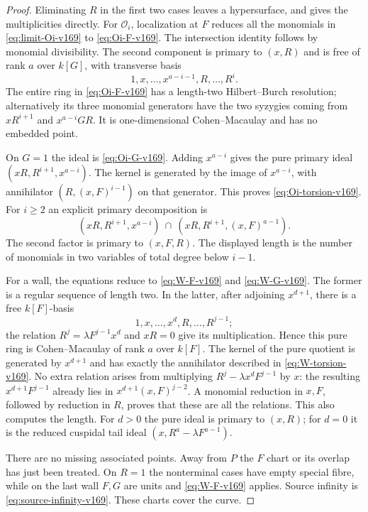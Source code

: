 \documentclass[11pt,reqno]{amsart}
\numberwithin{equation}{section}
\theoremstyle{definition}\newtheorem{definition}[theorem]{Definition}
\theoremstyle{remark}\newtheorem{remark}[theorem]{Remark}
\begin{document}
\begin{proof}
Eliminating $R$ in the first two cases leaves a hypersurface, and gives
the multiplicities directly. For $\mathcal O_i$, localization at $F$
reduces all the monomials in \eqref{eq:limit-Oi-v169} to
\eqref{eq:Oi-F-v169}. The intersection identity follows by monomial
divisibility. The second component is primary to $(x,R)$ and is free
of rank $a$ over $k[G]$, with transverse basis
\[
 1,x,\ldots,x^{a-i-1},R,\ldots,R^i.
\]
The entire ring in \eqref{eq:Oi-F-v169} has a length-two
Hilbert--Burch resolution; alternatively its three monomial generators
have the two syzygies coming from $xR^{i+1}$ and $x^{a-i}GR$.
It is one-dimensional Cohen--Macaulay and has no embedded point.

On $G=1$ the ideal is \eqref{eq:Oi-G-v169}. Adding $x^{a-i}$ gives
the pure primary ideal $(xR,R^{i+1},x^{a-i})$. The kernel is generated
by the image of $x^{a-i}$, with annihilator
$(R,(x,F)^{i-1})$ on that generator. This proves
\eqref{eq:Oi-torsion-v169}. For $i\geq2$ an explicit primary
decomposition is
\[
 (xR,R^{i+1},x^{a-i})
 \ \cap\ (xR,R^{i+1},(x,F)^{a-1}).
\]
The second factor is primary to $(x,F,R)$. The displayed length is
the number of monomials in two variables of total degree below $i-1$.

For a wall, the equations reduce to \eqref{eq:W-F-v169} and
\eqref{eq:W-G-v169}. The former is a regular sequence of length two.
In the latter, after adjoining $x^{d+1}$, there is a free $k[F]$-basis
\[
 1,x,\ldots,x^d,R,\ldots,R^{j-1};
\]
the relation $R^j=\lambda F^{j-1}x^d$ and $xR=0$ give its
multiplication. Hence this pure ring is Cohen--Macaulay of rank $a$
over $k[F]$. The kernel of the pure quotient is generated by
$x^{d+1}$ and has exactly the annihilator described in
\eqref{eq:W-torsion-v169}. No extra relation arises from multiplying
$R^j-\lambda x^dF^{j-1}$ by $x$: the resulting
$x^{d+1}F^{j-1}$ already lies in $x^{d+1}(x,F)^{j-2}$.
A monomial reduction in $x,F$, followed by reduction in $R$, proves
that these are all the relations. This also computes the length.
For $d>0$ the pure ideal is primary to $(x,R)$; for $d=0$ it is the
reduced cuspidal tail ideal $(x,R^a-\lambda F^{a-1})$.

There are no missing associated points. Away from $P$ the $F$ chart
or its overlap has just been treated. On $R=1$ the nonterminal cases
have empty special fibre, while on the last wall $F,G$ are units and
\eqref{eq:W-F-v169} applies. Source infinity is
\eqref{eq:source-infinity-v169}. These charts cover the curve.
\end{proof}
\end{document}
